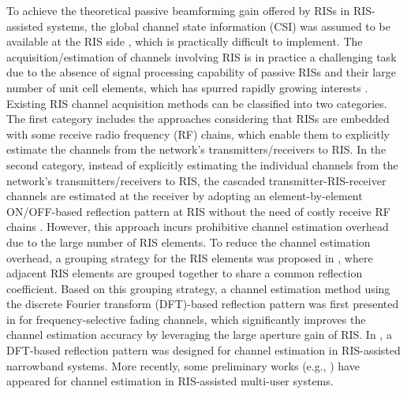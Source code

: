 \documentclass[draftclsnofoot,onecolumn,12pt]{IEEEtran}
\newcommand{\rev}[1]{{\color{red}#1}} %
\newcommand{\rev}[1]{#1}
\begin{document}
To achieve the theoretical passive beamforming gain offered by RISs in RIS-assisted systems, the global channel state information (CSI) was assumed to be available at the RIS side \cite{Wu2018Intelligent}, which is practically difficult to implement. 
The acquisition/estimation of channels involving RIS is in practice a challenging task due to the absence of signal processing capability of passive RISs and their large number of unit cell elements, which has spurred rapidly growing interests \cite{Tahaa2019enabling,Alexandropoulos2020A,Huang2019indoor,Mishra2019Channel,Z2019Cascaded,Yifei2019Intell,zheng2019Intell,you2019intell}. 
Existing RIS channel acquisition methods can be classified into two categories. 
The first category \cite{Tahaa2019enabling,Alexandropoulos2020A} includes the approaches considering that RISs are embedded with some receive radio frequency (RF) chains, 
which enable them to explicitly estimate the channels from the network's transmitters/receivers to RIS. 
In the second category, instead of explicitly estimating the individual channels from the network's transmitters/receivers to RIS, the cascaded transmitter-RIS-receiver channels are estimated at the receiver by adopting an element-by-element ON/OFF-based reflection pattern at RIS without the need of costly receive RF chains \cite{Mishra2019Channel}. 
However, this approach incurs prohibitive channel estimation overhead due to the large number of RIS elements. To reduce the channel estimation overhead, a grouping strategy for the RIS elements was proposed in \cite{Yifei2019Intell}, where adjacent RIS elements are grouped together to share a common reflection coefficient. Based on this grouping strategy, a channel estimation method using the discrete Fourier transform (DFT)-based reflection pattern was first presented in \cite{zheng2019Intell} for frequency-selective fading channels, which significantly improves the channel estimation accuracy by leveraging the large aperture gain of RIS. In \cite{Tobias2019An}, a DFT-based reflection pattern was designed for channel estimation in RIS-assisted narrowband systems. More recently, some preliminary works (e.g., \cite{Li2020Parallel,Beixiong2020Intelligent}) have appeared for channel estimation in RIS-assisted multi-user systems.
\end{document}

